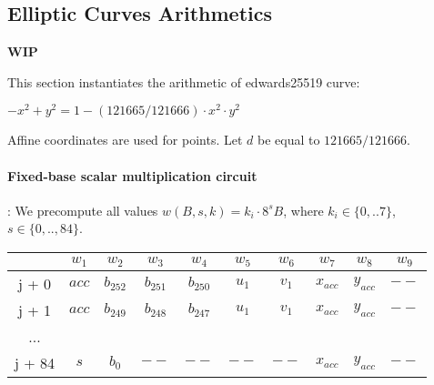 \subsection{Elliptic Curves Arithmetics}
\label{ellcurve}
\textbf{WIP}

This section instantiates the arithmetic of edwards25519 curve:
\begin{center}
    $- x^2 + y^2 = 1 - (121665/121666) \cdot x^2 \cdot y^2$
\end{center}
Affine coordinates are used for points.
Let $d$ be equal to $121665/121666$.

\paragraph{Fixed-base scalar multiplication circuit}:
We precompute all values $w(B,s,k) = k_i \cdot 8^s B$, where $k_i \in \{ 0,..7 \}$, $s \in \{0,.., 84\}$.
\begin{center}
    \begin{tabular}{ c|c|c|c|c|c|c|c|c|c }
        & $w_1$  & $w_2$  & $w_3$  & $w_4$  & $w_5$  & $w_6$ & $w_7$ & $w_8$ & $w_9$  \\
        \hline
        j + 0  & $acc$  & $b_{252}$ & $b_{251}$ & $b_{250}$ & $u_1$ & $v_1$ & $x_{acc}$ & $y_{acc}$ & $--$   \\
        j + 1  & $acc$  & $b_{249}$ & $b_{248}$ & $b_{247}$ & $u_1$ & $v_1$ & $x_{acc}$ & $y_{acc}$ & $--$   \\
        ...    &             &             &             &             &      & & & &  \\
        j + 84 & $s$  & $b_{0}$ & $--$ & $--$ & $--$ & $--$ & $x_{acc}$ & $y_{acc}$ & $--$   \\
    \end{tabular}
\end{center}

